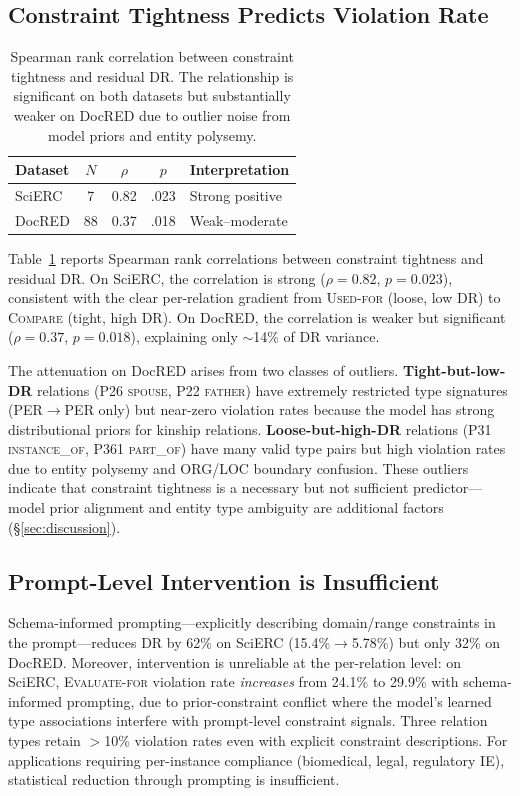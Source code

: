 \documentclass[11pt,a4paper]{article}
\begin{document}
\subsection{Constraint Tightness Predicts Violation Rate}

\begin{table}[t]
\centering
\small
\begin{tabular}{lcccl}
\toprule
\textbf{Dataset} & $N$ & $\rho$ & $p$ & \textbf{Interpretation} \\
\midrule
SciERC & 7 & 0.82 & .023 & Strong positive \\
DocRED & 88 & 0.37 & .018 & Weak--moderate \\
\bottomrule
\end{tabular}
\caption{Spearman rank correlation between constraint tightness and residual DR. The relationship is significant on both datasets but substantially weaker on DocRED due to outlier noise from model priors and entity polysemy.}
\label{tab:spearman}
\end{table}

Table~\ref{tab:spearman} reports Spearman rank correlations between constraint tightness and residual DR.
On SciERC, the correlation is strong ($\rho{=}0.82$, $p{=}0.023$), consistent with the clear per-relation gradient from \textsc{Used-for} (loose, low DR) to \textsc{Compare} (tight, high DR).
On DocRED, the correlation is weaker but significant ($\rho{=}0.37$, $p{=}0.018$), explaining only $\sim$14\% of DR variance.

The attenuation on DocRED arises from two classes of outliers.
\textbf{Tight-but-low-DR} relations (P26 \textsc{spouse}, P22 \textsc{father}) have extremely restricted type signatures (PER$\to$PER only) but near-zero violation rates because the model has strong distributional priors for kinship relations.
\textbf{Loose-but-high-DR} relations (P31 \textsc{instance\_of}, P361 \textsc{part\_of}) have many valid type pairs but high violation rates due to entity polysemy and ORG/LOC boundary confusion.
These outliers indicate that constraint tightness is a necessary but not sufficient predictor---model prior alignment and entity type ambiguity are additional factors (\S\ref{sec:discussion}).

\subsection{Prompt-Level Intervention is Insufficient}

Schema-informed prompting---explicitly describing domain/range constraints in the prompt---reduces DR by 62\% on SciERC (15.4\%$\to$5.78\%) but only 32\% on DocRED.
Moreover, intervention is unreliable at the per-relation level: on SciERC, \textsc{Evaluate-for} violation rate \emph{increases} from 24.1\% to 29.9\% with schema-informed prompting, due to prior-constraint conflict where the model's learned type associations interfere with prompt-level constraint signals.
Three relation types retain $>$10\% violation rates even with explicit constraint descriptions.
For applications requiring per-instance compliance (biomedical, legal, regulatory IE), statistical reduction through prompting is insufficient.
\end{document}
